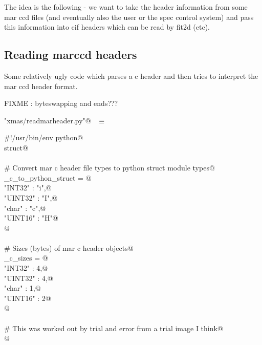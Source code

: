 \documentclass[10pt,a4paper,twoside,notitlepage]{article}
\begin{document}
The idea is the following - we want to take the header information from some 
mar ccd files (and eventually also the user or the spec control system) and
pass this information into cif headers which can be read by fit2d (etc).

\subsection{Reading marccd headers}

Some relatively ugly code which parses a c header and then tries to interpret
the mar ccd header format. 

FIXME : byteswapping and ends???

\begin{flushleft} \small \label{scrap20}
\verb@"xmas/readmarheader.py"@\nobreak\ {\footnotesize {} }$\equiv$
\vspace{-1ex}
\begin{list}{}{} \item
\mbox{}\verb@#!/usr/bin/env python@\\
\mbox{}\verb@import struct@\\
\mbox{}\verb@@\\
\mbox{}\verb@# Convert mar c header file types to python struct module types@\\
\mbox{}\verb@mar_c_to_python_struct = {@\\
\mbox{}\verb@    "INT32"  : "i",@\\
\mbox{}\verb@    "UINT32" : "I",@\\
\mbox{}\verb@    "char"   : "c",@\\
\mbox{}\verb@    "UINT16" : "H"@\\
\mbox{}\verb@    }@\\
\mbox{}\verb@@\\
\mbox{}\verb@# Sizes (bytes) of mar c header objects@\\
\mbox{}\verb@mar_c_sizes = {@\\
\mbox{}\verb@    "INT32"  : 4,@\\
\mbox{}\verb@    "UINT32" : 4,@\\
\mbox{}\verb@    "char"   : 1,@\\
\mbox{}\verb@    "UINT16" : 2@\\
\mbox{}\verb@    }@\\
\mbox{}\verb@@\\
\mbox{}\verb@# This was worked out by trial and error from a trial image I think@\\
\mbox{}@\\

\end{list}
\end{flushleft}
\end{document}
